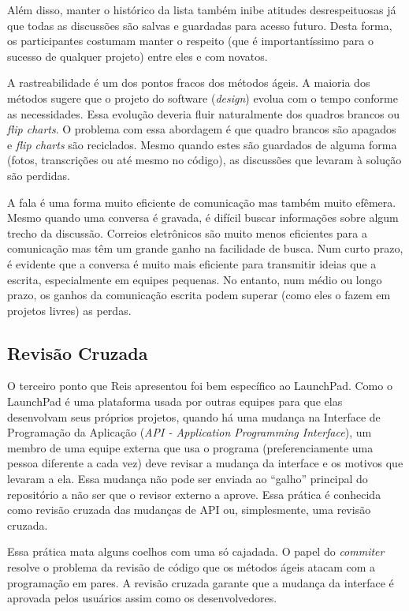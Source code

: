 Além disso, manter o histórico da lista também inibe atitudes
desrespeituosas já que todas as discussões são salvas e guardadas para
acesso futuro. Desta forma, os participantes costumam manter o
respeito (que é importantíssimo para o sucesso de qualquer projeto)
entre eles e com novatos.

A rastreabilidade é um dos pontos fracos dos métodos ágeis. A maioria
dos métodos sugere que o projeto do software (\emph{design}) evolua
com o tempo conforme as necessidades. Essa evolução deveria fluir
naturalmente dos quadros brancos ou \emph{flip charts}. O problema com
essa abordagem é que quadro brancos são apagados e \emph{flip charts}
são reciclados.  Mesmo quando estes são guardados de alguma forma
(fotos, transcrições ou até mesmo no código), as discussões que
levaram à solução são perdidas.

A fala é uma forma muito eficiente de comunicação mas também muito
efêmera. Mesmo quando uma conversa é gravada, é difícil buscar
informações sobre algum trecho da discussão. Correios eletrônicos são
muito menos eficientes para a comunicação mas têm um grande ganho na
facilidade de busca. Num curto prazo, é evidente que a conversa é
muito mais eficiente para transmitir ideias que a escrita,
especialmente em equipes pequenas. No entanto, num médio ou longo
prazo, os ganhos da comunicação escrita podem superar (como eles o
fazem em projetos livres) as perdas.

\subsection{Revisão Cruzada}
\label{subsec:crossrev}

O terceiro ponto que Reis apresentou foi bem específico ao
LaunchPad. Como o LaunchPad é uma plataforma usada por outras equipes
para que elas desenvolvam seus próprios projetos, quando há uma
mudança na Interface de Programação da Aplicação (\emph{API -
  Application Programming Interface}), um membro de uma equipe externa
que usa o programa (preferenciamente uma pessoa diferente a cada vez)
deve revisar a mudança da interface e os motivos que levaram a
ela. Essa mudança não pode ser enviada ao ``galho'' principal do
repositório a não ser que o revisor externo a aprove. Essa prática é
conhecida como revisão cruzada das mudanças de API ou, simplesmente,
uma revisão cruzada.

Essa prática mata alguns coelhos com uma só cajadada. O papel do
\emph{commiter} resolve o problema da revisão de código que os métodos
ágeis atacam com a programação em pares. A revisão cruzada garante que
a mudança da interface é aprovada pelos usuários assim como os
desenvolvedores.

